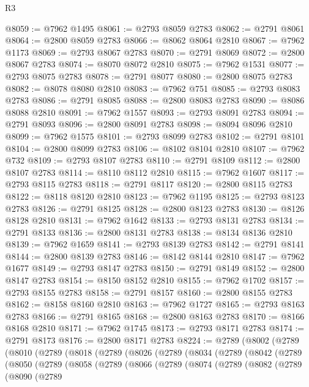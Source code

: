 \begin{lexlean}{R3}
\begin{coremodule}
@8059 := @7962 @1495
@8061 := @2793 @8059 @2783
@8062 := @2791 @8061
@8064 := @2800 @8059 @2783
@8066 := @8062 @8064 @2810
@8067 := @7962 @1173
@8069 := @2793 @8067 @2783
@8070 := @2791 @8069
@8072 := @2800 @8067 @2783
@8074 := @8070 @8072 @2810
@8075 := @7962 @1531
@8077 := @2793 @8075 @2783
@8078 := @2791 @8077
@8080 := @2800 @8075 @2783
@8082 := @8078 @8080 @2810
@8083 := @7962 @751
@8085 := @2793 @8083 @2783
@8086 := @2791 @8085
@8088 := @2800 @8083 @2783
@8090 := @8086 @8088 @2810
@8091 := @7962 @1557
@8093 := @2793 @8091 @2783
@8094 := @2791 @8093
@8096 := @2800 @8091 @2783
@8098 := @8094 @8096 @2810
@8099 := @7962 @1575
@8101 := @2793 @8099 @2783
@8102 := @2791 @8101
@8104 := @2800 @8099 @2783
@8106 := @8102 @8104 @2810
@8107 := @7962 @732
@8109 := @2793 @8107 @2783
@8110 := @2791 @8109
@8112 := @2800 @8107 @2783
@8114 := @8110 @8112 @2810
@8115 := @7962 @1607
@8117 := @2793 @8115 @2783
@8118 := @2791 @8117
@8120 := @2800 @8115 @2783
@8122 := @8118 @8120 @2810
@8123 := @7962 @1195
@8125 := @2793 @8123 @2783
@8126 := @2791 @8125
@8128 := @2800 @8123 @2783
@8130 := @8126 @8128 @2810
@8131 := @7962 @1642
@8133 := @2793 @8131 @2783
@8134 := @2791 @8133
@8136 := @2800 @8131 @2783
@8138 := @8134 @8136 @2810
@8139 := @7962 @1659
@8141 := @2793 @8139 @2783
@8142 := @2791 @8141
@8144 := @2800 @8139 @2783
@8146 := @8142 @8144 @2810
@8147 := @7962 @1677
@8149 := @2793 @8147 @2783
@8150 := @2791 @8149
@8152 := @2800 @8147 @2783
@8154 := @8150 @8152 @2810
@8155 := @7962 @1702
@8157 := @2793 @8155 @2783
@8158 := @2791 @8157
@8160 := @2800 @8155 @2783
@8162 := @8158 @8160 @2810
@8163 := @7962 @1727
@8165 := @2793 @8163 @2783
@8166 := @2791 @8165
@8168 := @2800 @8163 @2783
@8170 := @8166 @8168 @2810
@8171 := @7962 @1745
@8173 := @2793 @8171 @2783
@8174 := @2791 @8173
@8176 := @2800 @8171 @2783
@8224 := @2789
    (@8002
      (@2789
        (@8010
          (@2789
            (@8018
              (@2789
                (@8026
                  (@2789
                    (@8034
                      (@2789
                        (@8042
                          (@2789
                            (@8050
                              (@2789
                                (@8058
                                  (@2789
                                    (@8066
                                      (@2789
                                        (@8074
                                          (@2789
                                            (@8082
                                              (@2789
                                                (@8090
                                                  (@2789

\end{coremodule}
\end{lexlean}
